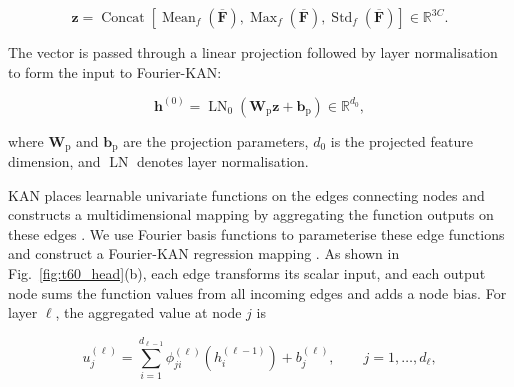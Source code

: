 \documentclass[a4paper,fleqn]{cas-sc}
\begin{document}

\begin{equation}
\mathbf z
=
\operatorname{Concat}
\left[
\operatorname{Mean}_{f}(\overline{\mathbf F}),
\operatorname{Max}_{f}(\overline{\mathbf F}),
\operatorname{Std}_{f}(\overline{\mathbf F})
\right]
\in\mathbb R^{3C}. \tag{10}\label{eq:stats_pool}
\end{equation}



The vector is passed through a linear projection followed by layer normalisation to form the input to Fourier-KAN:



\begin{equation}
\mathbf h^{(0)}
=
\operatorname{LN}_{0}
\left(\mathbf W_{\mathrm p}\mathbf z+\mathbf b_{\mathrm p}\right)
\in\mathbb R^{d_0}, \tag{11}\label{eq:projection}
\end{equation}



\noindent where $\mathbf W_{\mathrm p}$ and $\mathbf b_{\mathrm p}$ are the projection parameters, $d_0$ is the projected feature dimension, and $\operatorname{LN}$ denotes layer normalisation.



KAN places learnable univariate functions on the edges connecting nodes and constructs a multidimensional mapping by aggregating the function outputs on these edges \citep{liu2024kan}. We use Fourier basis functions to parameterise these edge functions and construct a Fourier-KAN regression mapping \citep{xu2025fourierkan}. As shown in Fig.~\ref{fig:t60_head}(b), each edge transforms its scalar input, and each output node sums the function values from all incoming edges and adds a node bias. For layer $\ell$, the aggregated value at node $j$ is



\begin{equation}
u_j^{(\ell)}
=
\sum_{i=1}^{d_{\ell-1}}
\phi_{ji}^{(\ell)}
\left(h_i^{(\ell-1)}\right)
+
b_j^{(\ell)},
\qquad j=1,\ldots,d_\ell, \tag{12}\label{eq:kan_aggregate}
\end{equation}

\end{document}
